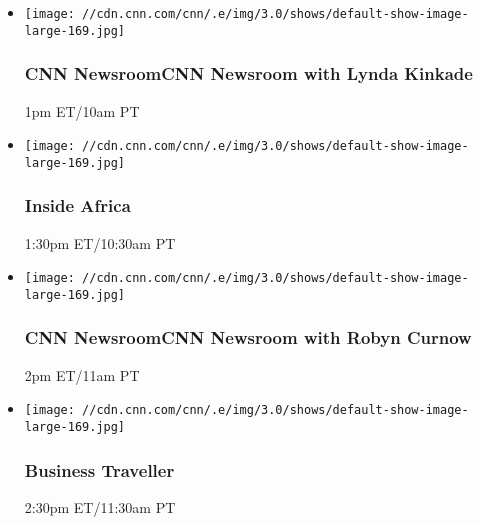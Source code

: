 \begin{itemize}
\item
  \texttt{[image: //cdn.cnn.com/cnn/.e/img/3.0/shows/default-show-image-large-169.jpg]}

  \hypertarget{cnn-newsroomcnn-newsroom-with-lynda-kinkade--2}{%
  \subsubsection{CNN NewsroomCNN Newsroom with Lynda Kinkade
  }\label{cnn-newsroomcnn-newsroom-with-lynda-kinkade--2}}

  1pm ET/10am PT
\end{itemize}

\begin{itemize}
\item
  \texttt{[image: //cdn.cnn.com/cnn/.e/img/3.0/shows/default-show-image-large-169.jpg]}

  \hypertarget{inside-africa-1}{%
  \subsubsection{Inside Africa}\label{inside-africa-1}}

  1:30pm ET/10:30am PT
\end{itemize}

\begin{itemize}
\item
  \texttt{[image: //cdn.cnn.com/cnn/.e/img/3.0/shows/default-show-image-large-169.jpg]}

  \hypertarget{cnn-newsroomcnn-newsroom-with-robyn-curnow-}{%
  \subsubsection{CNN NewsroomCNN Newsroom with Robyn Curnow
  }\label{cnn-newsroomcnn-newsroom-with-robyn-curnow-}}

  2pm ET/11am PT
\end{itemize}

\begin{itemize}
\item
  \texttt{[image: //cdn.cnn.com/cnn/.e/img/3.0/shows/default-show-image-large-169.jpg]}

  \hypertarget{business-traveller}{%
  \subsubsection{Business Traveller}\label{business-traveller}}

  2:30pm ET/11:30am PT
\end{itemize}

